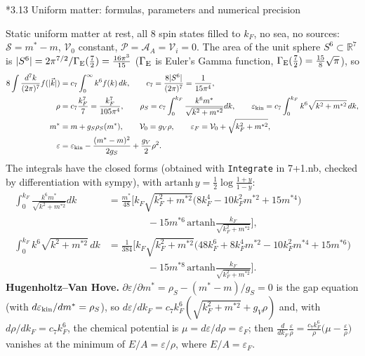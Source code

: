 \documentclass[10pt,a4paper]{article}
\makeatletter
\renewcommand\subsection{\@startsection{subsection}{2}{\z@}{-3.25ex\@plus -1ex \@minus -.2ex}{1.5ex \@plus .2ex}{\normalfont\large\bfseries\raggedright}}
\makeatother
\begin{document}
\subsection*{3.13 Uniform matter: formulas, parameters and numerical precision}
Static uniform matter at rest, all 8 spin states filled to $k_F$, no sea, no sources: $\mathcal S=m^*-m$, $\mathcal V_0$ constant, $\mathcal P=\mathcal A_A=\mathcal V_i=0$. The area of the unit sphere $S^6\subset\mathbb R^7$ is $|S^6|=2\pi^{7/2}/\Gamma_{\rm E}(\frac72)=\frac{16\pi^3}{15}$ ($\Gamma_{\rm E}$ is Euler’s Gamma function, $\Gamma_{\rm E}(\frac72)=\frac{15}8\sqrt\pi$), so
\begin{align*}
8\int\frac{d^7k}{(2\pi)^7}f(|\vec k|)&=c_7\int_0^\infty k^6f(k)\,dk,\qquad c_7=\frac{8|S^6|}{(2\pi)^7}=\frac1{15\pi^4}, \\
\rho&=c_7\frac{k_F^7}7=\frac{k_F^7}{105\pi^4},\qquad \rho_S=c_7\int_0^{k_F}\frac{k^6m^*}{\sqrt{k^2+m^{*2}}}dk,\qquad \varepsilon_{\rm kin}=c_7\int_0^{k_F}k^6\sqrt{k^2+m^{*2}}\,dk, \\
m^*&=m+g_S\rho_S(m^*),\qquad \mathcal V_0=g_V\rho,\qquad \varepsilon_F=\mathcal V_0+\sqrt{k_F^2+m^{*2}}, \\
\varepsilon&=\varepsilon_{\rm kin}-\frac{(m^*-m)^2}{2g_S}+\frac{g_V}2\rho^2 .
\end{align*}
The integrals have the closed forms (obtained with \texttt{Integrate} in 7+1.nb, checked by differentiation with sympy), with $\mathrm{artanh}\,y=\frac12\log\frac{1+y}{1-y}$:
\begin{align*}
\int_0^{k_F}\frac{k^6m^*}{\sqrt{k^2+m^{*2}}}dk&=\frac{m^*}{48}\Big[k_F\sqrt{k_F^2+m^{*2}}\big(8k_F^4-10k_F^2m^{*2}+15m^{*4}\big) \\
&\qquad\qquad-15m^{*6}\,\mathrm{artanh}\frac{k_F}{\sqrt{k_F^2+m^{*2}}}\Big], \\
\int_0^{k_F}k^6\sqrt{k^2+m^{*2}}\,dk&=\frac1{384}\Big[k_F\sqrt{k_F^2+m^{*2}}\big(48k_F^6+8k_F^4m^{*2}-10k_F^2m^{*4}+15m^{*6}\big) \\
&\qquad\qquad-15m^{*8}\,\mathrm{artanh}\frac{k_F}{\sqrt{k_F^2+m^{*2}}}\Big].
\end{align*}
\textbf{Hugenholtz–Van Hove.} $\partial\varepsilon/\partial m^*=\rho_S-(m^*-m)/g_S=0$ is the gap equation (with $d\varepsilon_{\rm kin}/dm^*=\rho_S$), so $d\varepsilon/dk_F=c_7k_F^6(\sqrt{k_F^2+m^{*2}}+g_V\rho)$ and, with $d\rho/dk_F=c_7k_F^6$, the chemical potential is $\mu=d\varepsilon/d\rho=\varepsilon_F$; then $\frac{d}{dk_F}\frac{\varepsilon}{\rho}=\frac{c_7k_F^6}{\rho}\big(\mu-\frac\varepsilon\rho\big)$ vanishes at the minimum of $E/A=\varepsilon/\rho$, where $E/A=\varepsilon_F$.
\end{document}
